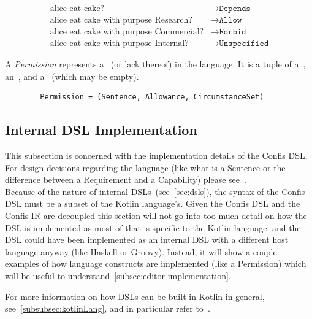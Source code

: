 \begin{align}
    \label{eq:allowance-cake-example}
    \text{alice eat cake?} &\to \texttt{Depends}\\
    \text{alice eat cake with purpose Research?} &\to \texttt{Allow}\\
    \text{alice eat cake with purpose Commercial?} &\to \texttt{Forbid}\\
    \text{alice eat cake with purpose Internal?} &\to \texttt{Unspecified}
\end{align}


\begin{definition}[Permission]
    \label{def:permission} A \emph{Permission} represents a~ (or lack thereof) in the language.
    It is a tuple of a~, an~, and a~ (which may be empty).
    \begin{verbatim}
        Permission = (Sentence, Allowance, CircumstanceSet)
    \end{verbatim}


\end{definition}

\subsection{Internal DSL Implementation}\label{subsec:dsl-implementation}

This subsection is concerned with the implementation details of the Confis DSL.
For design decisions regarding the language (like what is a Sentence or the difference between a Requirement and a Capability) please see~.\\

Because of the nature of internal DSLs~(see~\autoref{sec:dsls}), the syntax of the Confis DSL must be a subset of the Kotlin language's.
Given the Confis DSL and the Confis IR are decoupled this section will not go into too much detail on how the DSL is implemented as most of that is specific to the Kotlin language, and the DSL could have been implemented as an internal DSL with a different host language anyway (like Haskell or Groovy).
Instead, it will show a couple examples of how language constructs are implemented (like a Permission) which will be useful to understand~\autoref{subsec:editor-implementation}.

For more information on how DSLs can be built in Kotlin in general, see~\autoref{subsubsec:kotlinLang}, and in particular refer to~\cite{kotlinTypeSafeBuilders}.

